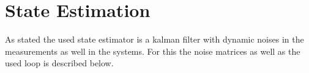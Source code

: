 \section{State Estimation} %
% 
% 
% 
% 
As stated the used state estimator is a kalman filter with dynamic noises in the measurements as well in the systems.
For this the noise matrices as well as the used loop is described below.

